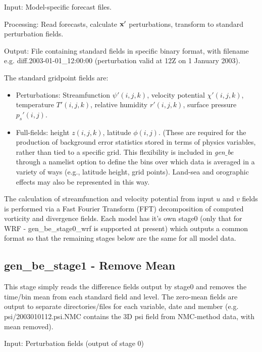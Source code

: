 Input: Model-specific forecast files.

Processing: Read forecasts, calculate ${\bf x'}$ perturbations, transform to standard perturbation fields.

Output: File containing standard fields in specific binary format, with filename e.g. diff.2003-01-01\_12:00:00 (perturbation valid at 12Z on 1 January 2003).

The standard gridpoint fields are:


\begin{itemize}\setlength{\parskip}{-4pt}
\item
 	Perturbations: Streamfunction $\psi'(i,j,k)$, velocity potential $\chi'(i,j,k)$, 
temperature $T'(i,j,k)$, relative humidity $r'(i,j,k)$, surface pressure $p_s'(i,j)$.

\item
 	Full-fields: height $z(i,j,k)$, latitude $\phi(i,j)$. (These are required for the 
production of background error statistics stored in terms of physics variables, 
rather than tied to a specific grid. This flexibility is included in {\it gen$\_$be} through a 
namelist option to define the bins over which data is averaged in a variety of ways 
(e.g., latitude height, grid points). Land-sea and orographic effects may also be 
represented in this way.
\end{itemize}

The calculation of streamfunction and velocity potential from input $u$ and $v$ fields is performed via a Fast Fourier Transform (FFT) decomposition of computed vorticity and divergence fields. Each model has it's own stage0 (only that for WRF - gen\_be\_stage0\_wrf is supported at present) which outputs a common format so that the remaining stages below are the same for all model data.


\subsection{gen\_be\_stage1 - Remove Mean}



This stage simply reads the difference fields output by stage0 and removes the time/bin mean from each standard field and level. The zero-mean fields are output to separate directories/files for each variable, date and member (e.g. psi/2003010112.psi.NMC contains the 3D psi field from NMC-method data, with mean removed).

Input: Perturbation fields (output of stage 0)

